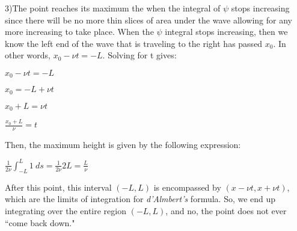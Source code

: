\documentclass[executivepaper]{article}
\begin{document}
\begin{flushleft}

3)The point reaches its maximum the when the integral of $\psi$ stops increasing since there will be no more thin slices of area under the wave allowing for any more increasing to take place. When the $\psi$ integral stops increasing, then we know the left end of the wave that is traveling to the right has passed $x_{0}$. In other words, $x_{0}-\nu t=-L$. Solving for t gives: 

\begin{center}

$x_{0}-\nu t=-L$

\vspace{1mm}

$x_{0}=-L+\nu t$

\vspace{1mm}

$x_{0}+L=\nu t$

\vspace{1mm}

$\frac{x_{0}+L}{\nu}=t$

\end{center}

Then, the maximum height is given by the following expression:

\begin{center}

$\frac{1}{2\nu} \int_{-L}^{L} 1 \ ds=\frac{1}{2\nu} 2L=\frac{L}{\nu}$

\end{center}

After this point, this interval $(-L, L)$ is encompassed by $(x-\nu t, x+\nu t)$, which are the limits of integration for \textit{d'Almbert's} formula. So, we end up integrating over the entire region $(-L,L)$, and no, the point does not ever ``come back down."

\end{flushleft}
\end{document}
